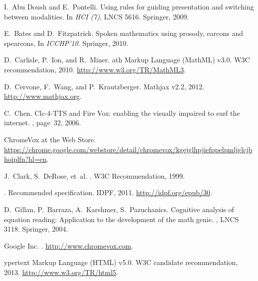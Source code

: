 \documentclass{sig-alternate}
\begin{document}
%  
\begin{thebibliography}{10}

I.~Abu Doush and E.~Pontelli.
\newblock Using rules for guiding presentation and switching between
  modalities.
\newblock In {\em HCI (7)}, LNCS 5616. Springer, 2009.

E.~Bates and D.~Fitzpatrick.
\newblock Spoken mathematics using prosody, earcons and spearcons.
\newblock In {\em ICCHP'10}. Springer, 2010.

D.~Carlisle, P.~Ion, and R.~Miner.
ath {M}arkup {L}anguage ({MathML}) v3.0. 
\newblock W3C recommendation, 2010. 
\newblock \url{http://www.w3.org/TR/MathML3}.

D.~Cervone, F.~Wang, and P.~Krautzberger.
\newblock Mathjax v2.2, 2012.
\newblock \url{http://www.mathjax.org}.

C.~Chen.
\newblock Clc-4-TTS and Fire Vox: enabling the visually impaired to surf the
  internet.
, page~32, 2006.

ChromeVox at the Web Store.
\newblock \url{https://chrome.google.com/webstore/detail/chromevox/kgejglhpjiefppelpmljglcjbhoiplfn?hl=en}.

J.~Clark, S.~DeRose, et~al.
.
\newblock W3C Recommendation,  1999.

.
\newblock Recommended specification. IDPF, 2011.
\newblock \url{http://idpf.org/epub/30}.

D.~Gillan, P.~Barraza, A.~Karshmer, S.~Pazuchanics.
\newblock Cognitive analysis of equation reading: Application to the
  development of the math genie.
, LNCS 3118. Springer, 2004.

{Google} Inc.
.
\newblock \url{http://www.chromevox.com}.

ypertext {M}arkup {L}anguage (HTML) v5.0.
\newblock W3C candidate recommendation, 2013.
\newblock \url{http://www.w3.org/TR/html5}.


\end{thebibliography}
\end{document}
